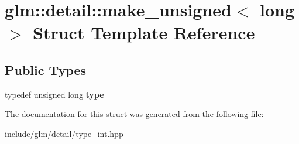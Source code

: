 \hypertarget{structglm_1_1detail_1_1make__unsigned_3_01long_01_4}{}\section{glm\+:\+:detail\+:\+:make\+\_\+unsigned$<$ long $>$ Struct Template Reference}
\label{structglm_1_1detail_1_1make__unsigned_3_01long_01_4}
\subsection*{Public Types}
\begin{DoxyCompactItemize}
\item 
\mbox{\label{structglm_1_1detail_1_1make__unsigned_3_01long_01_4_ade0cc74f63e30969e7d7b42eb6ac8289}} 
typedef unsigned long {\bfseries type}
\end{DoxyCompactItemize}


The documentation for this struct was generated from the following file\+:\begin{DoxyCompactItemize}
\item 
include/glm/detail/\hyperlink{type__int_8hpp}{type\+\_\+int.\+hpp}\end{DoxyCompactItemize}
